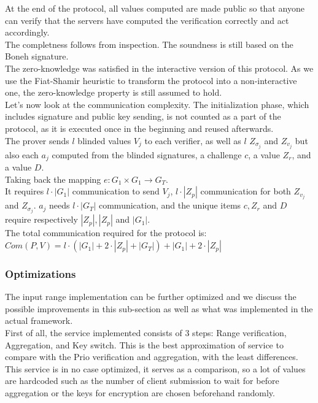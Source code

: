 \documentclass{article}
\begin{document}
At the end of the protocol, all values computed are made public so that anyone can verify that the servers have computed the verification correctly and act accordingly.\\

The completness follows from inspection. The soundness is still based on the Boneh signature.\\
The zero-knowledge was satisfied in the interactive version of this protocol. As we use the Fiat-Shamir heuristic \cite{fiatshamir} to transform the protocol into a  non-interactive one, the zero-knowledge property is still assumed to hold.\\

Let's now look at the communication complexity.
The initialization phase, which includes signature and public key sending, is not counted as a part of the protocol, as it is executed once in the beginning and reused afterwards.\\
The prover sends $l$ blinded values $V_j$ to each verifier, as well as $l$ $Z_{\sigma_j}$ and $Z_{v_j}$ but also each $a_j$ computed from the blinded signatures, a challenge $c$, a value $Z_r$, and a value $D$.\\
Taking back the mapping $e : G_1 \times G_1 \rightarrow G_T$.\\
It requires $l \cdot |G_1|$ communication to send $V_j$, $l \cdot |Z_p|$ communication for both $Z_{v_j}$ and $Z_{\sigma_j}$. $a_j$  needs $l \cdot |G_T|$ communication, and the unique items $c,Z_r $ and $D$ require respectively $ |Z_p|, |Z_p| $ and $|G_1|$.\\
The total communication required for the protocol is:\\
$Com(P,V) = l \cdot (|G_1| + 2 \cdot |Z_p| + |G_T|) + |G_1| + 2 \cdot |Z_p|$


\subsubsection*{Optimizations}
The input range implementation can be further optimized and we discuss the possible improvements in this sub-section as well as what was implemented in the actual framework.\\
First of all, the service implemented consists of 3 steps: Range verification, Aggregation, and Key switch. This is the best approximation of service to compare with the Prio verification and aggregation, with the least differences.\\
This service is in no case optimized, it serves as a comparison, so a lot of values are hardcoded such as the number of client submission to wait for before aggregation or the keys for encryption are chosen beforehand randomly.\\
\end{document}

